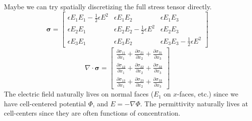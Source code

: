 \documentclass[final]{siamltex}
\def\sigmab {\boldsymbol{\sigma}}
\def\half   {\frac{1}{2}}
\begin{document}
Maybe we can try spatially discretizing the full stress tensor directly.
\begin{equation}
\sigmab =
\left[\begin{array}{ccc}
\epsilon E_1 E_1 - \half\epsilon E^2 & \epsilon E_1 E_2 & \epsilon E_1 E_3 \\
\epsilon E_2 E_1 & \epsilon E_2 E_2 - \half\epsilon E^2 & \epsilon E_2 E_3 \\
\epsilon E_3 E_1 & \epsilon E_3 E_2 & \epsilon E_3 E_3- \half\epsilon E^2 
\end{array}\right]
\end{equation}
\begin{equation}
\nabla\cdot\sigmab =
\left[\begin{array}{c}
\frac{\partial\sigma_{11}}{\partial x_1} + \frac{\partial\sigma_{21}}{\partial x_2} + \frac{\partial\sigma_{31}}{\partial x_3} \\
\frac{\partial\sigma_{12}}{\partial x_1} + \frac{\partial\sigma_{22}}{\partial x_2} + \frac{\partial\sigma_{32}}{\partial x_3} \\
\frac{\partial\sigma_{13}}{\partial x_1} + \frac{\partial\sigma_{23}}{\partial x_2} + \frac{\partial\sigma_{33}}{\partial x_3}
\end{array}\right]
\end{equation}
The electric field naturally lives on normal faces ($E_1$ on $x$-faces, etc.) since we 
have cell-centered potential $\Phi$, and $E=-\nabla\Phi$.
The permittivity naturally lives at cell-centers since they are often functions of 
concentration.
\end{document}

